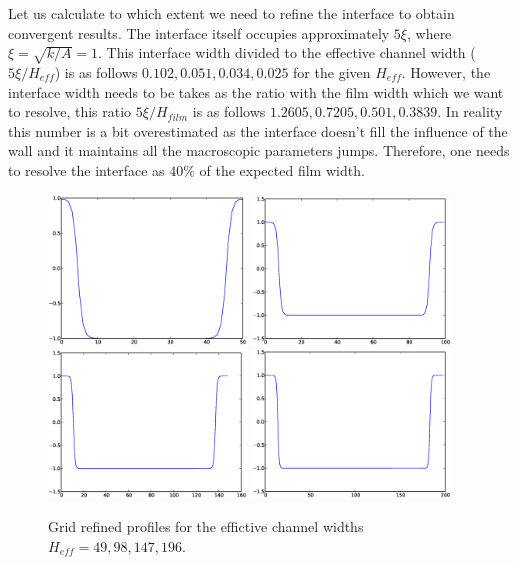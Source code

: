\documentclass{article}
\begin{document}
Let us calculate to which extent we need to refine the interface to obtain
convergent results. The interface itself occupies approximately $5 \xi$, where
$\xi=\sqrt{k/A}=1$. This interface width divided to the effective channel width
($5\xi/H_{eff}$) is as follows $0.102,0.051,0.034,0.025$ for the given
$H_{eff}$. However, the interface width needs to be takes as the ratio with the
film width which we want to resolve, this ratio $5\xi/H_{film}$ is as follows
$1.2605,  0.7205,  0.501,  0.3839$. In reality this number is
a bit overestimated as the interface doesn't fill the influence of the wall and
it maintains all the macroscopic parameters jumps. Therefore, one needs to
resolve the interface as $40\%$ of the expected film width.
\begin{figure}
\includegraphics[width=0.47\textwidth]{Figures/grid_phase_prof_49.eps}\hfill
\includegraphics[width=0.47\textwidth]{Figures/grid_phase_prof_98.eps}\\
\includegraphics[width=0.47\textwidth]{Figures/grid_phase_prof_147.eps}\hfill
\includegraphics[width=0.47\textwidth]{Figures/grid_phase_prof_196.eps}\\
\caption{Grid refined profiles for the effictive channel widths
$H_{eff}=49,98,147,196$.\label{fig:grid:profiles}}
\end{figure}
\end{document}
